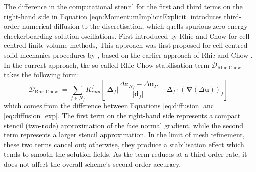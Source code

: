 \documentclass[sn-mathphys,Numbered,draft]{sn-jnl}%
\begin{document}
The difference in the computational stencil for the first and third terms on the right-hand side in Equation \ref{eqn:MomentumImplicitExplicit} introduces third-order numerical diffusion to the discretisation, which quells spurious zero-energy checkerboarding solution oscillations.
First introduced by Rhie and Chow \cite{rhie_numerical_1983} for cell-centred finite volume methods, 
This approach was first proposed for cell-centred solid mechanics procedures by \citet{demirdzic_numerical_1995}, based on the earlier approach of Rhie and Chow \citet{demirdzic_numerical_1995}.
In the current approach, the so-called Rhie-Chow stabilisation term $\mathcal{D}_{\text {Rhie-Chow }}$ takes the following form:
\begin{equation} \label{eq:RhieChow}
	\mathcal{D}_{\text {Rhie-Chow }}
	= \sum_{f \in N_f} K_{imp}^f
	\left[
	\left|\boldsymbol{\Delta}_f\right| \frac{\Delta \boldsymbol{u}_{N_f} - \Delta \boldsymbol{u}_P}{\left|\boldsymbol{d}_f\right|}
	- \boldsymbol{\Delta}_f \cdot(\boldsymbol{\nabla} (\Delta  \boldsymbol{u}))_f
	\right]
\end{equation}
which comes from the difference between Equations \ref{eq:diffusion} and \ref{eq:diffusion_exp}.
The first term on the right-hand side represents a compact stencil (two-node) approximation of the face normal gradient, while the second term represents a larger stencil approximation.
In the limit of mesh refinement, these two terms cancel out; otherwise, they produce a stabilisation effect which tends to smooth the solution fields.
As the term reduces at a third-order rate, it does not affect the overall scheme's second-order accuracy.
\end{document}
